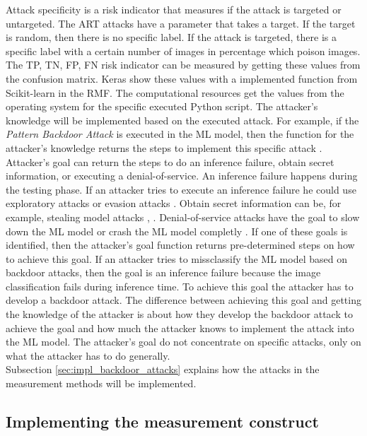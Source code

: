 Attack specificity is a risk indicator that measures if the attack is targeted or untargeted. The ART attacks have a parameter that takes a target. If the target is random, then there is no specific label. If the attack is targeted, there is a specific label with a certain number of images in percentage which poison images. The TP, TN, FP, FN risk indicator can be measured by getting these values from the confusion matrix. Keras show these values with a implemented function from Scikit-learn \cite{scikit-learn} in the RMF. The computational resources get the values from the operating system for the specific executed Python script. The attacker's knowledge will be implemented based on the executed attack. For example, if the \textit{Pattern Backdoor Attack} is executed in the ML model, then the function for the attacker's knowledge returns the steps to implement this specific attack \cite{bsi_2013}. Attacker's goal \cite{DBLP:journals/corr/abs-2012-04884} can return the steps to do an inference failure, obtain secret information, or executing a denial-of-service. An inference failure happens during the testing phase. If an attacker tries to execute an inference failure he could use exploratory attacks \cite{tabassi2019taxonomy} or evasion attacks \cite{DBLP:conf/sp/Carlini017}. Obtain secret information can be, for example, stealing model attacks \cite{DBLP:journals/corr/abs-2105-00623}, \cite{DBLP:journals/wicomm/ZhangLGQTZ20}. Denial-of-service attacks have the goal to slow down the ML model or crash the ML model completly \cite{DBLP:journals/sensors/VaccariAC20}. If one of these goals is identified, then the attacker's goal function returns pre-determined steps on how to achieve this goal. If an attacker tries to missclassify the ML model based on backdoor attacks, then the goal is an inference failure because the image classification fails during inference time. To achieve this goal the attacker has to develop a backdoor attack. The difference between achieving this goal and getting the knowledge of the attacker is about how they develop the backdoor attack to achieve the goal and how much the attacker knows to implement the attack into the ML model. The attacker's goal do not concentrate on specific attacks, only on what the attacker has to do generally. \\
Subsection \ref{sec:impl_backdoor_attacks} explains how the attacks in the measurement methods will be implemented.

\subsection{Implementing the measurement construct}

